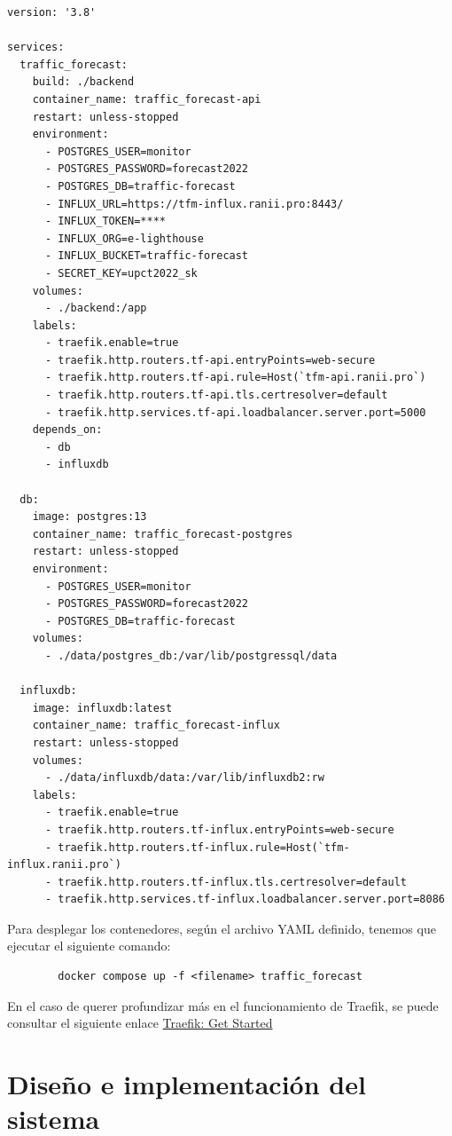 \documentclass[a4paper, oneside, 12pt]{book}
\begin{document}
	\begin{lstlisting}[style=yaml, caption={Archivo configuración de contenedores para entorno de producción.}]
version: '3.8'

services:
  traffic_forecast:
    build: ./backend
    container_name: traffic_forecast-api
    restart: unless-stopped
    environment:
      - POSTGRES_USER=monitor
      - POSTGRES_PASSWORD=forecast2022
      - POSTGRES_DB=traffic-forecast
      - INFLUX_URL=https://tfm-influx.ranii.pro:8443/
      - INFLUX_TOKEN=****
      - INFLUX_ORG=e-lighthouse
      - INFLUX_BUCKET=traffic-forecast
      - SECRET_KEY=upct2022_sk
    volumes:
      - ./backend:/app
    labels:
      - traefik.enable=true
      - traefik.http.routers.tf-api.entryPoints=web-secure
      - traefik.http.routers.tf-api.rule=Host(`tfm-api.ranii.pro`)
      - traefik.http.routers.tf-api.tls.certresolver=default
      - traefik.http.services.tf-api.loadbalancer.server.port=5000
    depends_on:
      - db
      - influxdb

  db:
    image: postgres:13
    container_name: traffic_forecast-postgres
    restart: unless-stopped
    environment:
      - POSTGRES_USER=monitor
      - POSTGRES_PASSWORD=forecast2022
      - POSTGRES_DB=traffic-forecast
    volumes:
      - ./data/postgres_db:/var/lib/postgressql/data

  influxdb:
    image: influxdb:latest
    container_name: traffic_forecast-influx
    restart: unless-stopped
    volumes:
      - ./data/influxdb/data:/var/lib/influxdb2:rw
    labels:
      - traefik.enable=true
      - traefik.http.routers.tf-influx.entryPoints=web-secure
      - traefik.http.routers.tf-influx.rule=Host(`tfm-influx.ranii.pro`)
      - traefik.http.routers.tf-influx.tls.certresolver=default
      - traefik.http.services.tf-influx.loadbalancer.server.port=8086
	\end{lstlisting} 

	\noindent Para desplegar los contenedores, según el archivo YAML definido, tenemos que ejecutar el siguiente comando: 
	
	\begin{verbatim}
		docker compose up -f <filename> traffic_forecast
	\end{verbatim}

	\noindent En el caso de querer profundizar más en el funcionamiento de Traefik, se puede consultar el siguiente enlace \href{https://doc.traefik.io/traefik/}{Traefik: Get Started}
	
	\chapter{Diseño e implementación del sistema}
	
\end{document}
